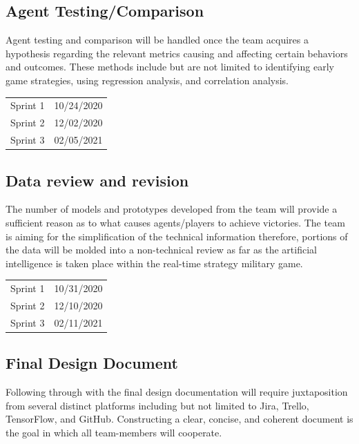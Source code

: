 \documentclass[a4paper,12pt]{report}
\begin{document}
\subsection{Agent Testing/Comparison}

Agent testing and comparison will be handled once the team acquires a hypothesis regarding the relevant metrics causing and affecting certain behaviors and outcomes. These methods include but are not limited to identifying early game strategies, using regression analysis, and correlation analysis.


\begin{center}\begin{tabular}{ll}
Sprint 1 & 10/24/2020 \\
Sprint 2 & 12/02/2020 \\
Sprint 3 & 02/05/2021
\end{tabular}\end{center}

\subsection{Data review and revision}

The number of models and prototypes developed from the team will provide a sufficient reason as to what causes agents/players to achieve victories. The team is aiming for the simplification of the technical information therefore, portions of the data will be molded into a non-technical review as far as the artificial intelligence is taken place within the real-time strategy military game.

\begin{center}\begin{tabular}{ll}
Sprint 1 & 10/31/2020 \\
Sprint 2 & 12/10/2020 \\
Sprint 3 & 02/11/2021
\end{tabular}\end{center}

\subsection{Final Design Document}

Following through with the final design documentation will require juxtaposition from several distinct platforms including but not limited to Jira, Trello, TensorFlow, and GitHub. Constructing a clear, concise, and coherent document is the goal in which all team-members will cooperate.
\end{document}
